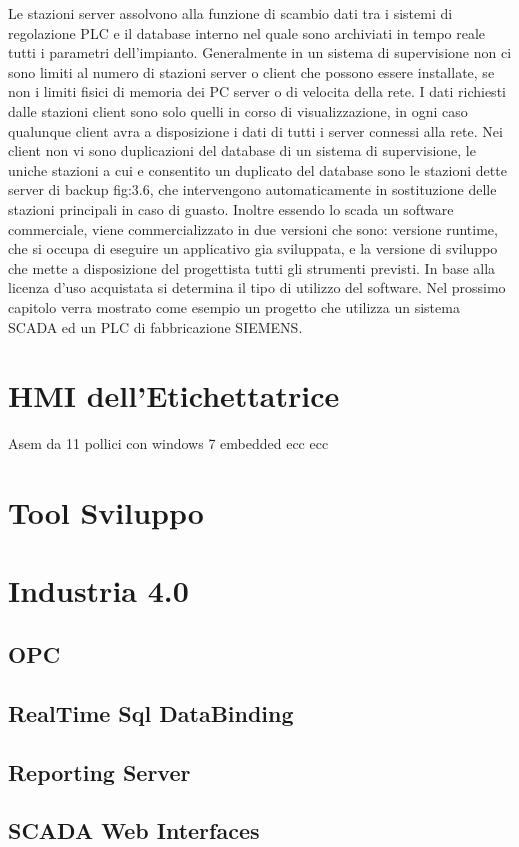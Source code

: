 \documentclass[12pt, a4paper, oneside]{book}
\begin{document}
Le stazioni server assolvono alla funzione di scambio dati tra i sistemi di regolazione PLC e il database interno nel quale sono archiviati in tempo reale tutti i parametri dell’impianto. Generalmente in un sistema di supervisione non ci sono limiti al numero di stazioni server o client che possono essere installate, se non i limiti fisici di memoria dei PC server o di velocita della rete.
I dati richiesti dalle stazioni client sono solo quelli in corso di visualizzazione, in ogni caso qualunque client avra a disposizione i dati di tutti i server connessi alla rete. Nei client non vi sono duplicazioni del database di un sistema di supervisione, le uniche stazioni a cui e consentito un duplicato del database sono le stazioni dette server di backup fig:3.6, che intervengono automaticamente in sostituzione delle stazioni principali in caso di guasto. Inoltre essendo lo scada un software commerciale, viene commercializzato in due versioni che sono: versione runtime, che si occupa di eseguire un applicativo gia sviluppata, e la versione di sviluppo che mette a disposizione del progettista tutti gli strumenti previsti. In base alla licenza d’uso acquistata si determina il tipo di utilizzo del software. Nel prossimo capitolo verra mostrato come esempio un progetto che utilizza un sistema SCADA ed un PLC di fabbricazione SIEMENS.

\section{HMI dell'Etichettatrice}
Asem da 11 pollici con windows 7 embedded ecc ecc
\section{Tool Sviluppo}
\section{Industria 4.0}
\subsection{OPC}
\subsection{RealTime Sql DataBinding}
\subsection{Reporting Server}
\subsection{SCADA Web Interfaces}
\end{document}
